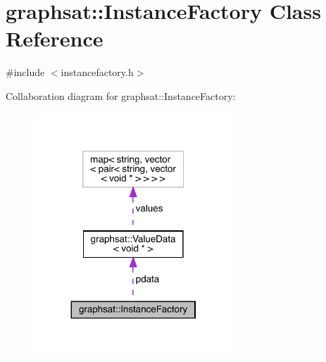 \hypertarget{classgraphsat_1_1_instance_factory}{}\section{graphsat\+::Instance\+Factory Class Reference}
\label{classgraphsat_1_1_instance_factory}


{\ttfamily \#include $<$instancefactory.\+h$>$}



Collaboration diagram for graphsat\+::Instance\+Factory\+:
\nopagebreak
\begin{figure}[H]
\begin{center}
\leavevmode
\includegraphics[width=212pt]{classgraphsat_1_1_instance_factory__coll__graph}
\end{center}
\end{figure}
